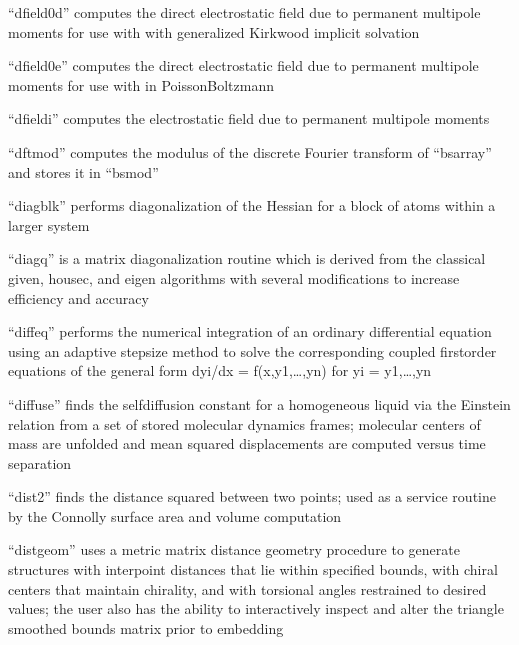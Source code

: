\documentclass[letterpaper,11pt,english]{sphinxmanual}
\begin{document}
“dfield0d” computes the direct electrostatic field due to
permanent multipole moments for use with with generalized
Kirkwood implicit solvation


“dfield0e” computes the direct electrostatic field due to
permanent multipole moments for use with in Poisson\sphinxhyphen{}Boltzmann


“dfieldi” computes the electrostatic field due to permanent
multipole moments


“dftmod” computes the modulus of the discrete Fourier transform
of “bsarray” and stores it in “bsmod”


“diagblk” performs diagonalization of the Hessian for a
block of atoms within a larger system


“diagq” is a matrix diagonalization routine which is derived
from the classical given, housec, and eigen algorithms with
several modifications to increase efficiency and accuracy


“diffeq” performs the numerical integration of an ordinary
differential equation using an adaptive stepsize method to
solve the corresponding coupled first\sphinxhyphen{}order equations of the
general form dyi/dx = f(x,y1,…,yn) for yi = y1,…,yn


“diffuse” finds the self\sphinxhyphen{}diffusion constant for a homogeneous
liquid via the Einstein relation from a set of stored molecular
dynamics frames; molecular centers of mass are unfolded and mean
squared displacements are computed versus time separation


“dist2” finds the distance squared between two points; used
as a service routine by the Connolly surface area and volume
computation


“distgeom” uses a metric matrix distance geometry procedure to
generate structures with interpoint distances that lie within
specified bounds, with chiral centers that maintain chirality,
and with torsional angles restrained to desired values; the
user also has the ability to interactively inspect and alter
the triangle smoothed bounds matrix prior to embedding
\end{document}
